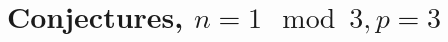 \documentclass{article}
\numberwithin{equation}{section}
\begin{document}
%
%
%
%
%
%
%
%





\section{Conjectures, $n=1 \mod 3, p=3$}
\end{document}
